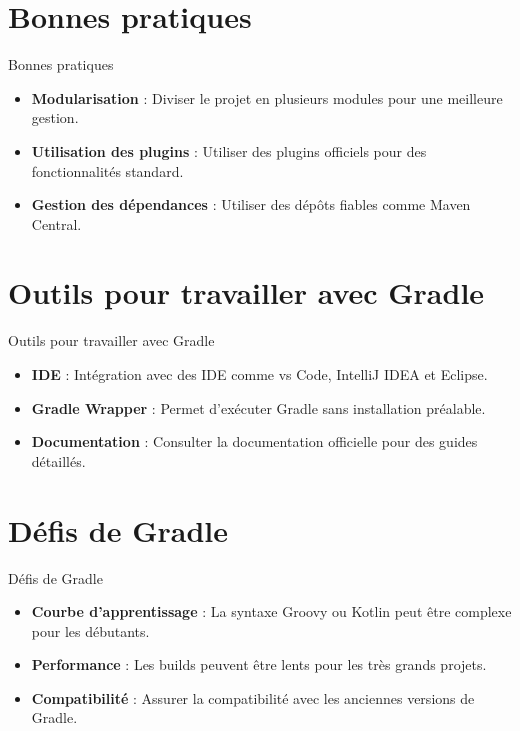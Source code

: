 \documentclass{clbeamer2024}
\begin{document}
	\section{Bonnes pratiques}
	\begin{frame}{Bonnes pratiques}
		\begin{itemize}
			\item \textbf{Modularisation} : Diviser le projet en plusieurs modules pour une meilleure gestion.
			\item \textbf{Utilisation des plugins} : Utiliser des plugins officiels pour des fonctionnalités standard.
			\item \textbf{Gestion des dépendances} : Utiliser des dépôts fiables comme Maven Central.
		\end{itemize}
	\end{frame}
	
	
	\section{Outils pour travailler avec Gradle}
	\begin{frame}{Outils pour travailler avec Gradle}
		\begin{itemize}
			\item \textbf{IDE} : Intégration avec des IDE comme vs Code, IntelliJ IDEA et Eclipse.
			\item \textbf{Gradle Wrapper} : Permet d'exécuter Gradle sans installation préalable.
			\item \textbf{Documentation} : Consulter la documentation officielle pour des guides détaillés.
		\end{itemize}
	\end{frame}
    
    
    \section{Défis de Gradle}
    \begin{frame}{Défis de Gradle}
    	\begin{itemize}
    		\item \textbf{Courbe d'apprentissage} : La syntaxe Groovy ou Kotlin peut être complexe pour les débutants.
    		\item \textbf{Performance} : Les builds peuvent être lents pour les très grands projets.
    		\item \textbf{Compatibilité} : Assurer la compatibilité avec les anciennes versions de Gradle.
    	\end{itemize}
    \end{frame}
    
\end{document}
